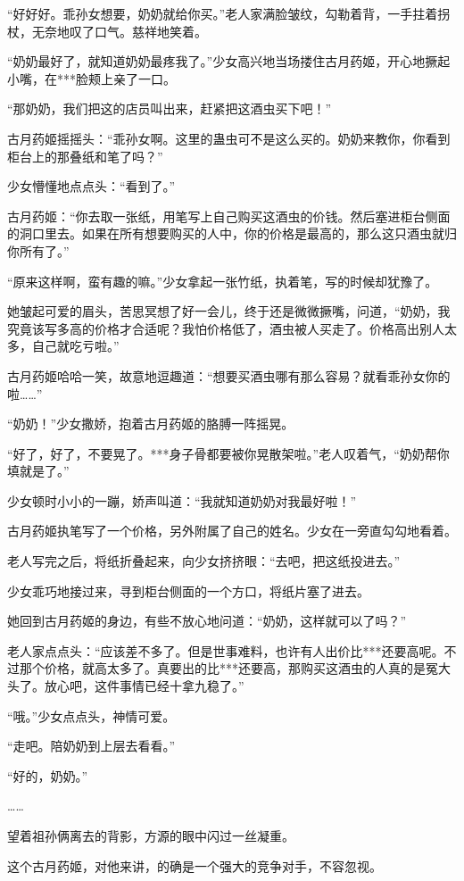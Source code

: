 \begin{this_body}
“好好好。乖孙女想要，奶奶就给你买。”老人家满脸皱纹，勾勒着背，一手拄着拐杖，无奈地叹了口气。慈祥地笑着。

“奶奶最好了，就知道奶奶最疼我了。”少女高兴地当场搂住古月药姬，开心地撅起小嘴，在***脸颊上亲了一口。

“那奶奶，我们把这的店员叫出来，赶紧把这酒虫买下吧！”

古月药姬摇摇头：“乖孙女啊。这里的蛊虫可不是这么买的。奶奶来教你，你看到柜台上的那叠纸和笔了吗？”

少女懵懂地点点头：“看到了。”

古月药姬：“你去取一张纸，用笔写上自己购买这酒虫的价钱。然后塞进柜台侧面的洞口里去。如果在所有想要购买的人中，你的价格是最高的，那么这只酒虫就归你所有了。”

“原来这样啊，蛮有趣的嘛。”少女拿起一张竹纸，执着笔，写的时候却犹豫了。

她皱起可爱的眉头，苦思冥想了好一会儿，终于还是微微撅嘴，问道，“奶奶，我究竟该写多高的价格才合适呢？我怕价格低了，酒虫被人买走了。价格高出别人太多，自己就吃亏啦。”

古月药姬哈哈一笑，故意地逗趣道：“想要买酒虫哪有那么容易？就看乖孙女你的啦……”

“奶奶！”少女撒娇，抱着古月药姬的胳膊一阵摇晃。

“好了，好了，不要晃了。***身子骨都要被你晃散架啦。”老人叹着气，“奶奶帮你填就是了。”

少女顿时小小的一蹦，娇声叫道：“我就知道奶奶对我最好啦！”

古月药姬执笔写了一个价格，另外附属了自己的姓名。少女在一旁直勾勾地看着。

老人写完之后，将纸折叠起来，向少女挤挤眼：“去吧，把这纸投进去。”

少女乖巧地接过来，寻到柜台侧面的一个方口，将纸片塞了进去。

她回到古月药姬的身边，有些不放心地问道：“奶奶，这样就可以了吗？”

老人家点点头：“应该差不多了。但是世事难料，也许有人出价比***还要高呢。不过那个价格，就高太多了。真要出的比***还要高，那购买这酒虫的人真的是冤大头了。放心吧，这件事情已经十拿九稳了。”

“哦。”少女点点头，神情可爱。

“走吧。陪奶奶到上层去看看。”

“好的，奶奶。”

……

望着祖孙俩离去的背影，方源的眼中闪过一丝凝重。

这个古月药姬，对他来讲，的确是一个强大的竞争对手，不容忽视。


\end{this_body}
